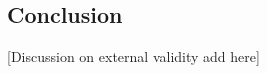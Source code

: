 \documentclass[a4paper,11pt]{article}
\begin{document}
\begin{spacing}{1.5}
 
\section{Conclusion}\label{Conclusion}

[Discussion on external validity add here]


 


\end{spacing}
\end{document}
